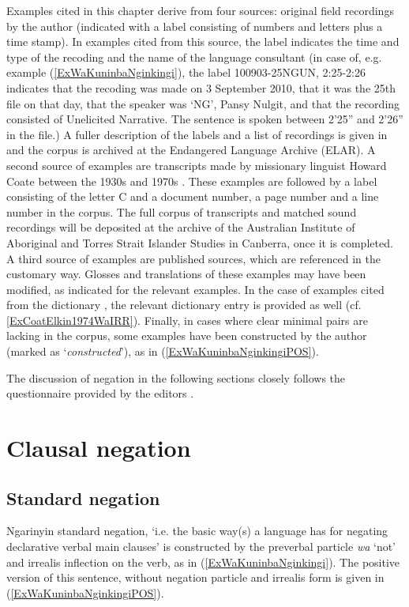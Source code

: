 \documentclass[output=paper,colorlinks,citecolor=brown]{langscibook}
\begin{document}
Examples cited in this chapter derive from four sources: original field recordings by the author (indicated with a label consisting of numbers and letters plus a time stamp). In examples cited from this source, the label indicates the time and type of the recoding and the name of the language consultant (in case of, e.g. example (\ref{ExWaKuninbaNginkingi}), the label 100903-25NGUN, 2:25-2:26 indicates that the recoding was made on 3 September 2010, that it was the 25th file on that day, that the speaker was `NG', Pansy Nulgit, and that the recording consisted of Unelicited Narrative. The sentence is spoken between 2'25'' and 2'26'' in the file.) A fuller description of the labels and a list of recordings is given in \citet{Spronck2015} and the corpus is archived at the Endangered Language Archive (ELAR). A second source of examples are transcripts made by missionary linguist Howard Coate between the 1930s and 1970s \citep{Coate1930-1971}. These examples are followed by a label consisting of the letter C and a document number, a page number and a line number in the corpus. The full corpus of transcripts and matched sound recordings will be deposited at the archive of the Australian Institute of Aboriginal and Torres Strait Islander Studies in Canberra, once it is completed. A third source of examples are published sources, which are referenced in the customary way. Glosses and translations of these examples may have been modified, as indicated for the relevant examples. In the case of examples cited from the dictionary \citet{CoatElkin1974}, the relevant dictionary entry is provided as well (cf. \ref{ExCoatElkin1974WaIRR}). Finally, in cases where clear minimal pairs are lacking in the corpus, some examples have been constructed by the author (marked as `\textit{constructed}'), as in (\ref{ExWaKuninbaNginkingiPOS}).

The discussion of negation in the following sections closely follows the questionnaire provided by the editors .
\section{Clausal negation} \label{SecClausalNEG}
\subsection{Standard negation}

Ngarinyin standard negation, `i.e. the basic way(s) a language has for negating declarative verbal main clauses'
\citep[1]{Miestamo2005} is constructed by the preverbal particle \textit{wa} `not' and irrealis inflection on the verb, as in (\ref{ExWaKuninbaNginkingi}). The positive version of this sentence, without negation particle and irrealis form is given in (\ref{ExWaKuninbaNginkingiPOS}).
\end{document}
